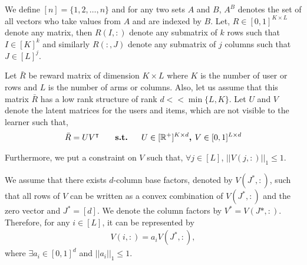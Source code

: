 	
	We define $[n] = \lbrace 1,2,\ldots, n\rbrace$ and for any two sets $A$ and $B$, $A^B$ denotes the set of all vectors who take values from $A$ and are indexed by $B$. Let, $R\in [0,1]^{K\times L}$ denote any matrix, then $R(I,:)$ denote any submatrix of $k$ rows such that $I\in[K]^k$ and similarly $R(:,J)$ denote any submatrix of $j$ columns such that $J\in[L]^{j}$.
	
	Let $\bar{R}$ be reward matrix of  dimension $K\times L$ where $K$ is the number of user or rows and $L$ is the number of arms or columns. Also, let us assume that this matrix  $\bar{R}$ has a low rank structure of rank $d << \min\lbrace L,K\rbrace$. Let $U$ and $V$ denote the latent matrices for the users and items, which are not visible to the learner such that,
\begin{align*}
	\bar{R} = UV^{\intercal} \textbf{ \hspace*{4mm}   s.t.   \hspace*{4mm}} U\in [ \mathbb{R}^+ ]^{K\times d} \textbf{, } V\in  [0,1]^{L\times d} 
\end{align*}	  
	
	Furthermore, we put a constraint on $V$ such that, $\forall j\in [L]$, $ ||V(j,:)||_1 \leq 1$. 
	
	
%	


\begin{assumption}
\label{assm:1}
We assume that there exists $d$-column base factors, denoted by $V(J^*,:)$, such that all rows of $V$ can be written as a convex combination of $V(J^*,:)$ and the zero vector and $J^* = [d]$. We denote the column factors by $V^* = V(J*,:)$. Therefore, for any $i\in [L]$, it can be represented by
\begin{align*}
V(i,:) = a_i V(J^*,:) , 
\end{align*}
where $\exists a_i\in [0,1]^{d}$ and $ ||a_i||_1 \leq 1$.
\end{assumption}


%
